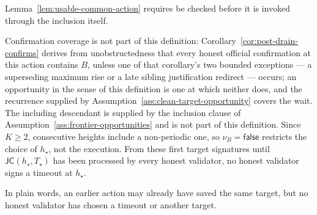 \begin{definition}
\begin{enumerate}
   Lemma~\ref{lem:usable-common-action} requires be checked before it
   is invoked through the inclusion itself.
\end{enumerate}  Confirmation coverage
is not part of this definition: Corollary~\ref{cor:post-drain-confirms}
derives from unobstructedness that every honest official confirmation at
this action contains \(B\), unless one of that corollary's two bounded
exceptions --- a superseding maximum rise or a late sibling
justification redirect --- occurs; an opportunity in the sense of this
definition is one at which neither does, and the recurrence supplied by
Assumption~\ref{ass:clean-target-opportunity} covers the wait.  The including
descendant is supplied by the inclusion clause of
Assumption~\ref{ass:frontier-opportunities} and is not part of this
definition.  Since \(K\geq2\), consecutive heights include a
non-periodic one, so \(\nu_B=\mathsf{false}\) restricts the choice of
\(h_\star\), not the execution.
From these first target signatures until
\(\mathsf{JC}(h_\star,T_\star)\) has been processed by every honest
validator, no honest validator signs a timeout at \(h_\star\).

In plain words, an earlier action may already have saved the same target, but
no honest validator has chosen a timeout or another target.
\end{definition}

